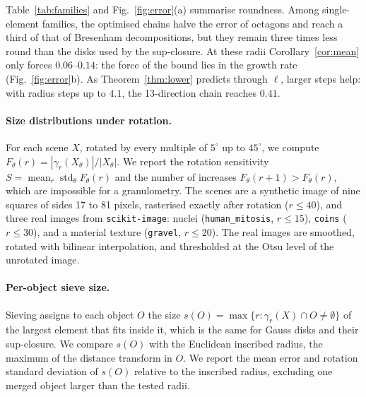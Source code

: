 \documentclass[runningheads]{llncs}
\begin{document}
Table~\ref{tab:families} and Fig.~\ref{fig:error}(a) summarise roundness. Among single-element families, the optimised chains halve the error of octagons and reach a third of that of Bresenham decompositions, but they remain three times less round than the disks used by the sup-closure. At these radii Corollary~\ref{cor:mean} only forces $0.06$--$0.14$: the force of the bound lies in the growth rate (Fig.~\ref{fig:error}b). As Theorem~\ref{thm:lower} predicts through $\ell$, larger steps help: with radius steps up to $4.1$, the 13-direction chain reaches $0.41$.

\paragraph{Size distributions under rotation.} For each scene $X$, rotated by every multiple of $5^\circ$ up to $45^\circ$, we compute $F_\theta(r)=|\gamma_r(X_\theta)|/|X_\theta|$. We report the rotation sensitivity $S=\operatorname{mean}_r\operatorname{std}_\theta F_\theta(r)$ and the number of increases $F_\theta(r+1)>F_\theta(r)$, which are impossible for a granulometry. The scenes are a synthetic image of nine squares of sides 17 to 81 pixels, rasterised exactly after rotation ($r\le40$), and three real images from \texttt{scikit-image}: nuclei (\texttt{human\_mitosis}, $r\le15$), \texttt{coins} ($r\le30$), and a material texture (\texttt{gravel}, $r\le20$). The real images are smoothed, rotated with bilinear interpolation, and thresholded at the Otsu level of the unrotated image.

\paragraph{Per-object sieve size.} Sieving assigns to each object $O$ the size $s(O)=\max\{r:\gamma_r(X)\cap O\ne\emptyset\}$ of the largest element that fits inside it, which is the same for Gauss disks and their sup-closure. We compare $s(O)$ with the Euclidean inscribed radius, the maximum of the distance transform in $O$. We report the mean error and rotation standard deviation of $s(O)$ relative to the inscribed radius, excluding one merged object larger than the tested radii.
\end{document}
